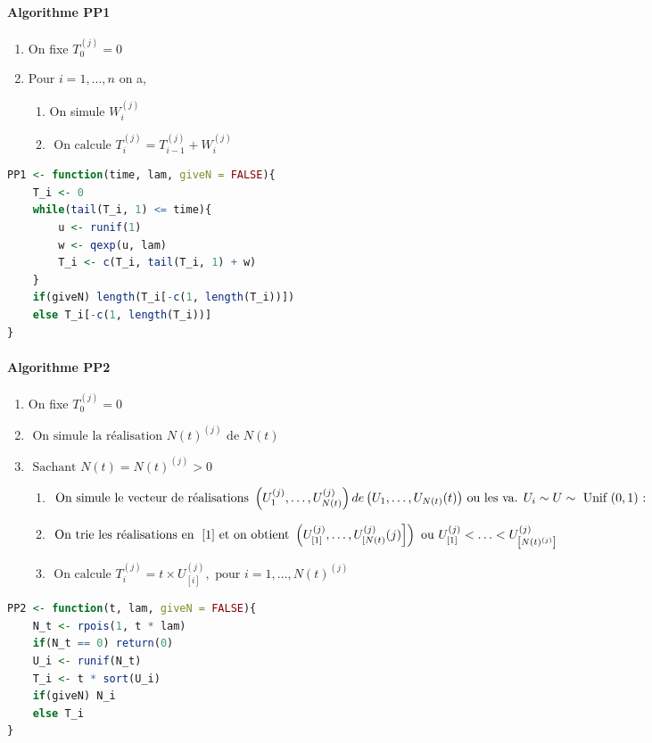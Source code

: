 \paragraph{Algorithme PP1}
\begin{enumerate}
    \item On fixe $T_0^{(j)} = 0$
    \item Pour $i = 1,...,n$ on a,
        \begin{enumerate}[label=2.\arabic*]
        \item On simule $W_i^{(j)}$
        \item $\text { On calcule } T_{i}^{(j)}=T_{i-1}^{(j)}+W_{i}^{(j)} $
        \end{enumerate}
\end{enumerate}
\begin{lstlisting}[language=R, caption={Mise en oeuvre de PP1 en R}]
PP1 <- function(time, lam, giveN = FALSE){
    T_i <- 0
    while(tail(T_i, 1) <= time){
        u <- runif(1)
        w <- qexp(u, lam)
        T_i <- c(T_i, tail(T_i, 1) + w)
    }
    if(giveN) length(T_i[-c(1, length(T_i))])
    else T_i[-c(1, length(T_i))]
}
\end{lstlisting}

\paragraph{Algorithme PP2}
\begin{enumerate}
    \item On fixe $T_0^{(j)} = 0$
    \item $\text { On simule la réalisation } N(t)^{(j)} \text { de } N(t)$
    \item $\text { Sachant } N(t)=N(t)^{(j)}>0$ 
        \begin{enumerate}[label=3.\arabic*]
        \item ${\text { On simule le vecteur de réalisations }\left(U_{1}^{(j)}, \ldots, U_{N(t)}^{(j)}\right) d e\left(U_{1}, \ldots, U_{N(t)}(t)\right)} \\ {\text { ou les va. } U_{i} \sim U \sim \text { Unif }(0,1) \text { : }}$
        \item ${ \text { On trie les réalisations en }\left.[1] \text { et on obtient }\left(U_{[1]}^{(j)}, \ldots, U_{[N(t)}^{(j)}(j)\right]\right) \text { ou }} \\ {U_{[1]}^{(j)}<\ldots<U_{\left[N(t)^{(j)}\right]}^{(j)}}$
        \item $\text { On calcule } T_{i}^{(j)}=t \times U_{[i]}^{(j)}, \text { pour } i=1, \ldots, N(t)^{(j)}$
        \end{enumerate}
\end{enumerate}
\begin{lstlisting}[language=R, caption={Mise en oeuvre de PP2 en R}]
PP2 <- function(t, lam, giveN = FALSE){
    N_t <- rpois(1, t * lam)
    if(N_t == 0) return(0)
    U_i <- runif(N_t)
    T_i <- t * sort(U_i) 
    if(giveN) N_i 
    else T_i
}
\end{lstlisting}



